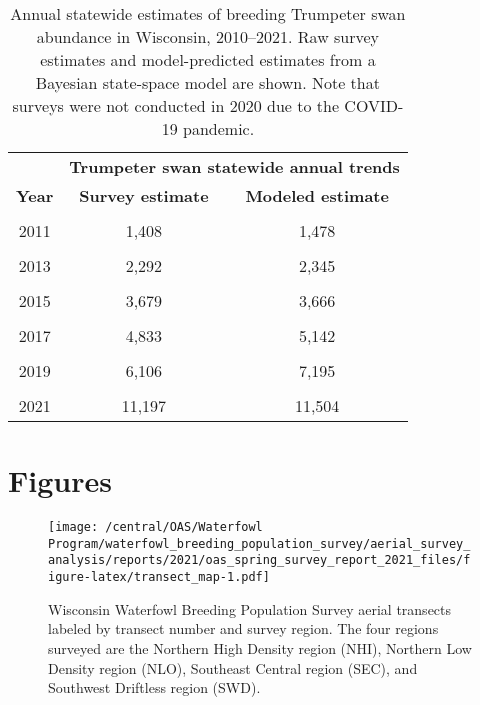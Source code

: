 \documentclass[
  12pt,
]{article}
\begin{document}
\newpage

\begin{table}[!h]

\caption{\label{tab:trump_tab}Annual statewide estimates of breeding Trumpeter swan abundance in Wisconsin, 2010--2021. Raw survey estimates and model-predicted estimates from a Bayesian state-space model are shown. Note that surveys were not conducted in 2020 due to the COVID-19 pandemic.}
\centering
\begin{tabular}[t]{ccc}
\toprule
\multicolumn{1}{c}{\textbf{ }} & \multicolumn{2}{c}{\textbf{Trumpeter swan statewide annual trends}} \\
\cmidrule(l{3pt}r{3pt}){2-3}
\textbf{Year} & \textbf{Survey estimate} & \textbf{Modeled estimate}\\
\midrule
\cellcolor{gray!6}{2010} & \cellcolor{gray!6}{1,237} & \cellcolor{gray!6}{1,205}\\
2011 & 1,408 & 1,478\\
\cellcolor{gray!6}{2012} & \cellcolor{gray!6}{1,999} & \cellcolor{gray!6}{1,908}\\
2013 & 2,292 & 2,345\\
\cellcolor{gray!6}{2014} & \cellcolor{gray!6}{2,979} & \cellcolor{gray!6}{2,956}\\
2015 & 3,679 & 3,666\\
\cellcolor{gray!6}{2016} & \cellcolor{gray!6}{5,029} & \cellcolor{gray!6}{4,581}\\
2017 & 4,833 & 5,142\\
\cellcolor{gray!6}{2018} & \cellcolor{gray!6}{5,677} & \cellcolor{gray!6}{6,078}\\
2019 & 6,106 & 7,195\\
\cellcolor{gray!6}{2020} & \cellcolor{gray!6}{} & \cellcolor{gray!6}{9,750}\\
2021 & 11,197 & 11,504\\
\bottomrule
\end{tabular}
\end{table}

\newpage

\hypertarget{figures}{%
\section{Figures}\label{figures}}

\begin{figure}
\centering
\texttt{[image: /central/OAS/Waterfowl Program/waterfowl\_breeding\_population\_survey/aerial\_survey\_analysis/reports/2021/oas\_spring\_survey\_report\_2021\_files/figure-latex/transect\_map-1.pdf]}
\caption{\label{fig:transect_map}Wisconsin Waterfowl Breeding Population
Survey aerial transects labeled by transect number and survey region.
The four regions surveyed are the Northern High Density region (NHI),
Northern Low Density region (NLO), Southeast Central region (SEC), and
Southwest Driftless region (SWD).}
\end{figure}
\end{document}
